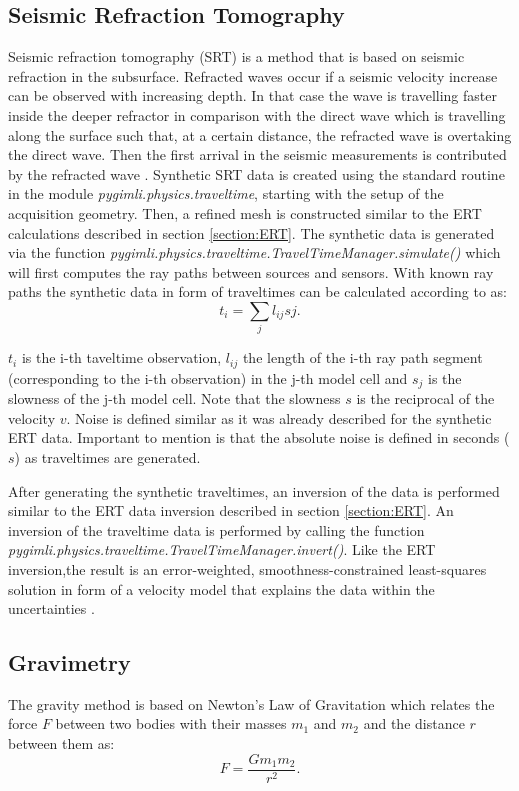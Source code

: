 \subsection{Seismic Refraction Tomography}\label{section:TT}
Seismic refraction tomography (SRT) is a method that is based on seismic refraction in the subsurface. Refracted waves occur if a seismic velocity increase can be observed with increasing depth. In that case the wave is travelling faster inside the deeper refractor in comparison with the direct wave which is travelling along the surface such that, at a certain distance, the refracted wave is overtaking the direct wave. Then the first arrival in the seismic measurements is contributed by the refracted wave \citep{kearey2002introduction}. Synthetic SRT data is created using the standard routine in the module \textit{pygimli.physics.traveltime}, starting with the setup of the acquisition geometry. Then, a refined mesh is constructed similar to the ERT calculations described in section \ref{section:ERT}. The synthetic data is generated via the function \textit{pygimli.physics.traveltime.TravelTimeManager.simulate()} which will first computes the ray paths between sources and sensors. With known ray paths the synthetic data in form of traveltimes can be calculated according to \citet{zelt2021traveltime} as:
\begin{equation}
    t_i = \sum_j l_{ij}sj .
    \label{Eq:TT}
\end{equation}

$t_i$ is the i-th taveltime observation, $l_{ij}$ the length of the i-th ray path segment (corresponding to the i-th observation) in the j-th model cell and $s_j$ is the slowness of the j-th model cell. Note that the slowness $s$ is the reciprocal of the velocity $v$. Noise is defined similar as it was already described for the synthetic ERT data. Important to mention is that the absolute noise is defined in seconds ($s$) as traveltimes are generated.

After generating the synthetic traveltimes, an inversion of the data is performed similar to the ERT data inversion described in section \ref{section:ERT}. An inversion of the traveltime data is performed by calling the function \textit{pygimli.physics.traveltime.TravelTimeManager.invert()}. Like the ERT inversion,the result is an error-weighted, smoothness-constrained least-squares solution in form of a velocity model that explains the data within the uncertainties \citep{Ruecker2017}.


\subsection{Gravimetry}\label{section:Gravimetry}
The gravity method is based on Newton's Law of Gravitation which relates the force $F$ between two bodies with their masses $m_1$ and $m_2$ and the distance $r$ between them as:
\begin{equation}
    F = \frac{Gm_1 m_2}{r^2}.
    \label{Eq:Newton1}
\end{equation}

